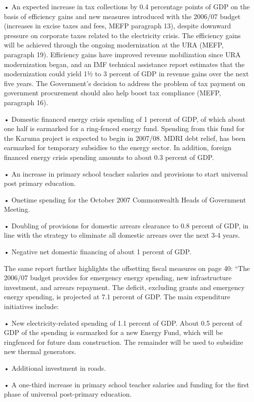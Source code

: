 •	An expected increase in tax collections by 0.4 percentage points of GDP on the basis of efficiency gains and new measures introduced with the 2006/07 budget (increases in excise taxes and fees, MEFP paragraph 13), despite downward pressure on corporate taxes related to the electricity crisis. The efficiency gains will be achieved through the ongoing modernization at the URA (MEFP, paragraph 19). Efficiency gains have improved revenue mobilization since URA modernization began, and an IMF technical assistance report estimates that the modernization could yield 1½ to 3 percent of GDP in revenue gains over the next five years. The Government’s decision to address the problem of tax payment on government procurement should also help boost tax compliance (MEFP, paragraph 16).

•	Domestic financed energy crisis spending of 1 percent of GDP, of which about one half is earmarked for a ring-fenced energy fund. Spending from this fund for the Karuma project is expected to begin in 2007/08. MDRI debt relief, has been earmarked for temporary subsidies to the energy sector. In addition, foreign financed energy crisis spending amounts to about 0.3 percent of GDP.

•	An increase in primary school teacher salaries and provisions to start universal post primary education.

•	Onetime spending for the October 2007 Commonwealth Heads of Government Meeting.

•	Doubling of provisions for domestic arrears clearance to 0.8 percent of GDP, in line with the strategy to eliminate all domestic arrears over the next 3-4 years.

•	Negative net domestic financing of about 1 percent of GDP.

The same report further highlights the offsetting fiscal measures on page 40: “The 2006/07 budget provides for emergency energy spending, new infrastructure investment, and arrears repayment. The deficit, excluding grants and emergency energy spending, is projected at 7.1 percent of GDP. The main expenditure initiatives include:

• New electricity-related spending of 1.1 percent of GDP. About 0.5 percent of GDP of the spending is earmarked for a new Energy Fund, which will be ringfenced for future dam construction. The remainder will be used to subsidize new thermal generators.

• Additional investment in roads.

• A one-third increase in primary school teacher salaries and funding for the first phase of universal post-primary education.

